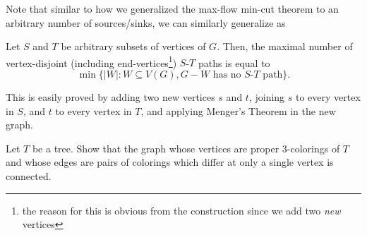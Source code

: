 Note that similar to how we generalized the max-flow min-cut theorem to an arbitrary number of sources/sinks, we can similarly generalize  as

\begin{theorem}
Let $S$ and $T$ be arbitrary subsets of vertices of $G$. Then, the maximal number of vertex-disjoint (including end-vertices\footnote{the reason for this is obvious from the construction since we add two \textit{new} vertices}) $S$-$T$ paths is equal to
\[ \min\{|W|:W\subseteq V(G), G-W\text{ has no $S$-$T$ path}\}. \]
\end{theorem}
This is easily proved by adding two new vertices $s$ and $t$, joining $s$ to every vertex in $S$, and $t$ to every vertex in $T$, and applying Menger's Theorem in the new graph.


\begin{exercise}
Let $T$ be a tree. Show that the graph whose vertices are proper $3$-colorings of $T$ and whose edges are pairs of colorings which differ at only a single vertex is connected.
\end{exercise}